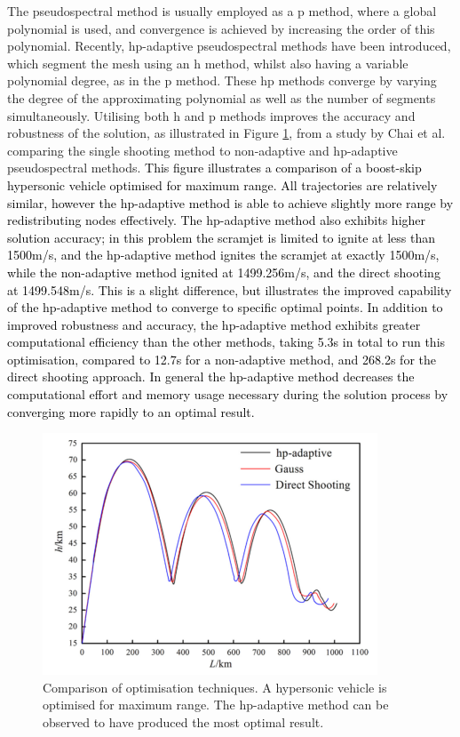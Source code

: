 The pseudospectral method is usually employed as a \textsf{p} method, where a global polynomial is used, and convergence is achieved by increasing the order of this polynomial\cite{Rao2009}. Recently, \textsf{hp}-adaptive pseudospectral methods have been introduced, which segment the mesh using an h method, whilst also having a variable polynomial degree, as in the \textsf{p} method\cite{Darby2011a}. These \textsf{hp} methods converge by varying the degree of the approximating polynomial as well as the number of segments simultaneously. Utilising both \textsf{h} and \textsf{p} methods improves the accuracy and robustness of the solution, as illustrated in Figure \ref{fig:OptimisationMethodComparisonChai}, from a study by Chai et al.\cite{Chai2015} comparing the single shooting method to non-adaptive and \textsf{hp}-adaptive pseudospectral methods. \textcolor{black}{This figure illustrates a comparison of a boost-skip hypersonic vehicle optimised for maximum range. All trajectories are relatively similar, however the \textsf{hp}-adaptive method is able to achieve slightly more range by redistributing nodes effectively. The \textsf{hp}-adaptive method also exhibits higher solution accuracy; in this problem the scramjet is limited to ignite at less than 1500m/s, and the \textsf{hp}-adaptive method ignites the scramjet at exactly 1500m/s, while the non-adaptive method ignited at 1499.256m/s, and the direct shooting at 1499.548m/s. This is a slight difference, but illustrates the improved capability of the \textsf{hp}-adaptive method to converge to specific optimal points. In addition to improved robustness and accuracy, the \textsf{hp}-adaptive method exhibits greater computational efficiency than the other methods, taking 5.3s in total to run this optimisation, compared to 12.7s for a non-adaptive method, and 268.2s for the direct shooting approach. In general the \textsf{hp}-adaptive method decreases the computational effort and memory usage necessary during the solution process by converging more rapidly to an optimal result\cite{Darby2011a,Chai2015}. }


\begin{figure}[ht]
	\centering
	\includegraphics[width=0.7\linewidth]{figures/2_literature-review/OptimisationMethodComparisonChai}
	\caption{Comparison of optimisation techniques\cite{Chai2015}. A hypersonic vehicle is optimised for maximum range. The \textsf{hp}-adaptive method can be observed to have produced the most optimal result.}
	\label{fig:OptimisationMethodComparisonChai}
\end{figure}

